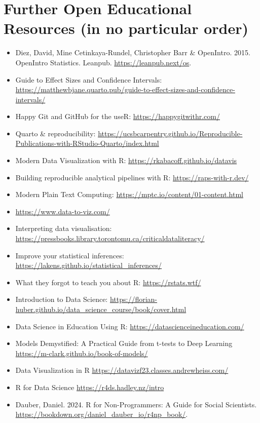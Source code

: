\documentclass[
  letterpaper,
  DIV=11,
  numbers=noendperiod]{scrreprt}
\providecommand{\tightlist}{%
  \setlength{\itemsep}{0pt}\setlength{\parskip}{0pt}}\usepackage{longtable,booktabs,array}
\begin{document}
\section{Further Open Educational Resources (in no particular
order)}\label{further-open-educational-resources-in-no-particular-order}

\begin{itemize}
\tightlist
\item
  Diez, David, Mine Cetinkaya-Rundel, Christopher Barr \& OpenIntro.
  2015. OpenIntro Statistics. Leanpub. \url{https://leanpub.next/os}.
\item
  Guide to Effect Sizes and Confidence Intervals:
  \url{https://matthewbjane.quarto.pub/guide-to-effect-sizes-and-confidence-intervals/}
\item
  Happy Git and GitHub for the useR: \url{https://happygitwithr.com/}
\item
  Quarto \& reproducibility:
  \url{https://ucsbcarpentry.github.io/Reproducible-Publications-with-RStudio-Quarto/index.html}
\item
  Modern Data Visualization with R:
  \url{https://rkabacoff.github.io/datavis}
\item
  Building reproducible analytical pipelines with R:
  \url{https://raps-with-r.dev/}
\item
  Modern Plain Text Computing:
  \url{https://mptc.io/content/01-content.html}
\item
  \url{https://www.data-to-viz.com/}
\item
  Interpreting data visualisation:
  \url{https://pressbooks.library.torontomu.ca/criticaldataliteracy/}
\item
  Improve your statistical inferences:
  \url{https://lakens.github.io/statistical_inferences/}
\item
  What they forgot to teach you about R: \url{https://rstats.wtf/}
\item
  Introduction to Data Science:
  \url{https://florian-huber.github.io/data_science_course/book/cover.html}
\item
  Data Science in Education Using R:
  \url{https://datascienceineducation.com/}
\item
  Models Demystified: A Practical Guide from t-tests to Deep Learning
  \url{https://m-clark.github.io/book-of-models/}
\item
  Data Visualization in R
  \url{https://datavizf23.classes.andrewheiss.com/}
\item
  R for Data Science \url{https://r4ds.hadley.nz/intro}
\item
  Dauber, Daniel. 2024. R for Non-Programmers: A Guide for Social
  Scientists. \url{https://bookdown.org/daniel_dauber_io/r4np_book/}.
\end{itemize}
\end{document}
